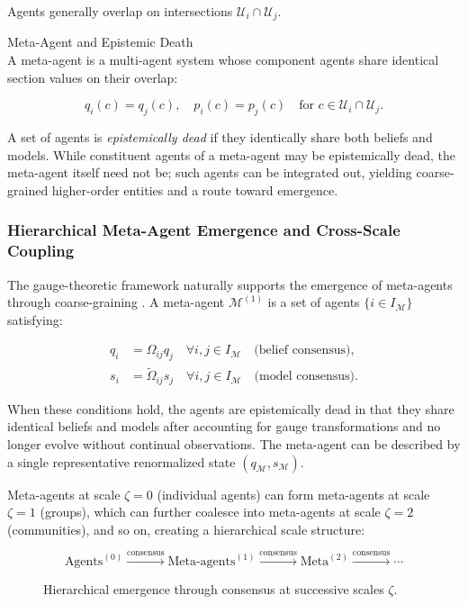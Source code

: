 \documentclass[twoside,11pt]{article}
\begin{document}
Agents generally overlap on intersections $\mathcal{U}_i \cap \mathcal{U}_j$.

Meta-Agent and Epistemic Death\\
A meta-agent is a multi-agent system whose component agents share identical section values on their overlap:

\begin{equation}
q_i(c) = q_j(c), \quad p_i(c) = p_j(c) \quad \text{for } c \in \mathcal{U}_i \cap \mathcal{U}_j.
\end{equation}

A set of agents is \emph{epistemically dead} if they identically share both beliefs and models. While constituent agents of a meta-agent may be epistemically dead, the meta-agent itself need not be; such agents can be integrated out, yielding coarse-grained higher-order entities and a route toward emergence.

\subsubsection{Hierarchical Meta-Agent Emergence and Cross-Scale Coupling}
\label{sec:appendix_meta_agent}

The gauge-theoretic framework naturally supports the emergence of meta-agents through coarse-graining \citep{shen2008coarse}. A meta-agent $\mathcal{M}^{(1)}$ is a set of agents $\{i \in I_{\mathcal{M}}\}$ satisfying:

\begin{align}
q_i &= \Omega_{ij} q_j \quad \forall i,j \in I_{\mathcal{M}} \quad \text{(belief consensus)}, \label{eq:belief_consensus} \\
s_i &= \tilde{\Omega}_{ij} s_j \quad \forall i,j \in I_{\mathcal{M}} \quad \text{(model consensus)}. \label{eq:model_consensus}
\end{align}

When these conditions hold, the agents are epistemically dead in that they share identical beliefs and models after accounting for gauge transformations and no longer evolve without continual observations. The meta-agent can be described by a single representative renormalized state $(q_{\mathcal{M}}, s_{\mathcal{M}})$.

Meta-agents at scale $\zeta=0$ (individual agents) can form meta-agents at scale $\zeta=1$ (groups), which can further coalesce into meta-agents at scale $\zeta=2$ (communities), and so on, creating a hierarchical scale structure:

\begin{figure}[h]
\centering
\small
\[
\text{Agents}^{(0)} \xrightarrow{\text{consensus}}
\text{Meta-agents}^{(1)} \xrightarrow{\text{consensus}}
\text{Meta}^{(2)} \xrightarrow{\text{consensus}} \cdots
\]
\caption{Hierarchical emergence through consensus at successive scales $\zeta$.}
\label{fig:hierarchy}
\end{figure}
\end{document}
